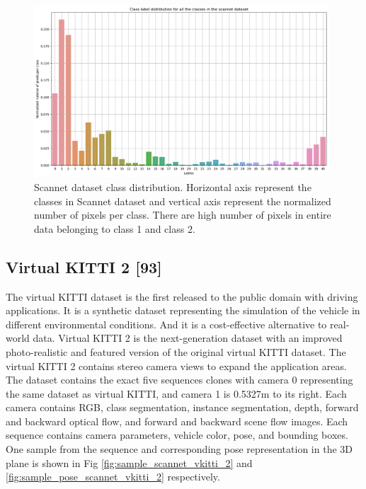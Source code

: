 	\begin{figure}
		\centering
		\includegraphics[width=11cm]{images/scannet_data_class_distribution.png}
		\caption{Scannet dataset class distribution. Horizontal axis represent the classes in Scannet dataset and vertical axis represent the normalized number of pixels per class. There are high number of pixels in entire data belonging to class 1 and class 2.}
		\label{fig:scannet_class_distribution}
	\end{figure}

    \subsection{Virtual KITTI 2 [93]}
    
	The virtual KITTI dataset is the first released to the public domain with driving applications. It is a synthetic dataset representing the simulation of the vehicle in different environmental conditions. And it is a cost-effective alternative to real-world data. Virtual KITTI 2 is the next-generation dataset with an improved photo-realistic and featured version of the original virtual KITTI dataset. The virtual KITTI 2 contains stereo camera views to expand the application areas. The dataset contains the exact five sequences clones with camera 0 representing the same dataset as virtual KITTI, and camera 1 is 0.5327m to its right. Each camera contains RGB, class segmentation, instance segmentation, depth, forward and backward optical flow, and forward and backward scene flow images. Each sequence contains camera parameters, vehicle color, pose, and bounding boxes. One sample from the sequence and corresponding pose representation in the 3D plane is shown in Fig \ref{fig:sample_scannet_vkitti_2} and \ref{fig:sample_pose_scannet_vkitti_2} respectively.
	 
